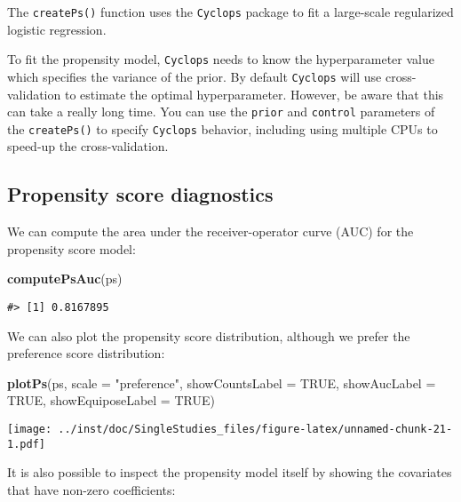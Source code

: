 \documentclass[]{article}
\newenvironment{Shaded}{\begin{snugshade}}{\end{snugshade}}
\newcommand{\DataTypeTok}[1]{\textcolor[rgb]{0.13,0.29,0.53}{#1}}
\newcommand{\KeywordTok}[1]{\textcolor[rgb]{0.13,0.29,0.53}{\textbf{#1}}}
\newcommand{\NormalTok}[1]{#1}
\newcommand{\OtherTok}[1]{\textcolor[rgb]{0.56,0.35,0.01}{#1}}
\newcommand{\StringTok}[1]{\textcolor[rgb]{0.31,0.60,0.02}{#1}}
\begin{document}
The \texttt{createPs()} function uses the \texttt{Cyclops} package to
fit a large-scale regularized logistic regression.

To fit the propensity model, \texttt{Cyclops} needs to know the
hyperparameter value which specifies the variance of the prior. By
default \texttt{Cyclops} will use cross-validation to estimate the
optimal hyperparameter. However, be aware that this can take a really
long time. You can use the \texttt{prior} and \texttt{control}
parameters of the \texttt{createPs()} to specify \texttt{Cyclops}
behavior, including using multiple CPUs to speed-up the
cross-validation.

\hypertarget{propensity-score-diagnostics}{%
\subsection{Propensity score
diagnostics}\label{propensity-score-diagnostics}}

We can compute the area under the receiver-operator curve (AUC) for the
propensity score model:

\begin{Shaded}
\begin{Highlighting}[]
\KeywordTok{computePsAuc}\NormalTok{(ps)}
\end{Highlighting}
\end{Shaded}

\begin{verbatim}
#> [1] 0.8167895
\end{verbatim}

We can also plot the propensity score distribution, although we prefer
the preference score distribution:

\begin{Shaded}
\begin{Highlighting}[]
\KeywordTok{plotPs}\NormalTok{(ps, }\DataTypeTok{scale =} \StringTok{"preference"}\NormalTok{, }\DataTypeTok{showCountsLabel =} \OtherTok{TRUE}\NormalTok{, }\DataTypeTok{showAucLabel =} \OtherTok{TRUE}\NormalTok{, }\DataTypeTok{showEquiposeLabel =} \OtherTok{TRUE}\NormalTok{)}
\end{Highlighting}
\end{Shaded}

\texttt{[image: ../inst/doc/SingleStudies\_files/figure-latex/unnamed-chunk-21-1.pdf]}

It is also possible to inspect the propensity model itself by showing
the covariates that have non-zero coefficients:
\end{document}
